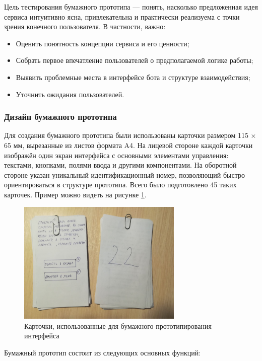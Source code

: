 \documentclass[pdflatex,sn-mathphys-num]{sn-jnl}%
\theoremstyle{thmstyleone}%
\theoremstyle{thmstyletwo}%
\theoremstyle{thmstylethree}%
\begin{document}
Цель тестирования бумажного прототипа — понять, насколько предложенная идея сервиса интуитивно ясна, привлекательна и практически реализуема с точки зрения конечного пользователя. В частности, важно:

\begin{itemize}
\item Оценить понятность концепции сервиса и его ценности;
\item Собрать первое впечатление пользователей о предполагаемой логике работы;
\item Выявить проблемные места в интерфейсе бота и структуре взаимодействия;
\item Уточнить ожидания пользователей.
\end{itemize}

\subsubsection{Дизайн бумажного прототипа}

Для создания бумажного прототипа были использованы карточки размером 115 × 65 мм, вырезанные из листов формата A4. На лицевой стороне каждой карточки изображён один экран интерфейса с основными элементами управления: текстами, кнопками, полями ввода и другими компонентами. На оборотной стороне указан уникальный идентификационный номер, позволяющий быстро ориентироваться в структуре прототипа. Всего было подготовлено 45 таких карточек. Пример можно видеть на рисунке \ref{fig:bot_cards}.

\begin{figure}[]
\centering
\includegraphics[width=0.7\textwidth, angle=270]{figures/bot_cards.jpg}
\caption{Карточки, использованные для бумажного прототипирования интерфейса}
\label{fig:bot_cards}
\end{figure}

Бумажный прототип состоит из следующих основных функций:
\end{document}
